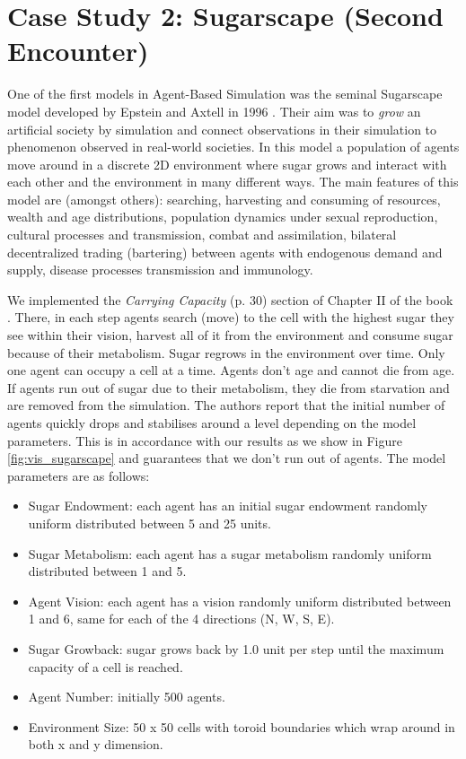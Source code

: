 \section{Case Study 2: Sugarscape (Second Encounter)}
\label{sec:cs_sugarscape}

One of the first models in Agent-Based Simulation was the seminal Sugarscape model developed by Epstein and Axtell in 1996 \cite{epstein_growing_1996}. Their aim was to \textit{grow} an artificial society by simulation and connect observations in their simulation to phenomenon observed in real-world societies. In this model a population of agents move around in a discrete 2D environment where sugar grows and interact with each other and the environment in many different ways. The main features of this model are (amongst others): searching, harvesting and consuming of resources, wealth and age distributions, population dynamics under sexual reproduction, cultural processes and transmission, combat and assimilation, bilateral decentralized trading (bartering) between agents with endogenous demand and supply, disease processes transmission and immunology.

We implemented the \textit{Carrying Capacity} (p. 30) section of Chapter II of the book \cite{epstein_growing_1996}. There, in each step agents search (move) to the cell with the highest sugar they see within their vision, harvest all of it from the environment and consume sugar because of their metabolism. Sugar regrows in the environment over time. Only one agent can occupy a cell at a time. Agents don't age and cannot die from age. If agents run out of sugar due to their metabolism, they die from starvation and are removed from the simulation. The authors report that the initial number of agents quickly drops and stabilises around a level depending on the model parameters. This is in accordance with our results as we show in Figure \ref{fig:vis_sugarscape} and guarantees that we don't run out of agents. The model parameters are as follows:

\begin{itemize}
	\item Sugar Endowment: each agent has an initial sugar endowment randomly uniform distributed between 5 and 25 units.
	\item Sugar Metabolism: each agent has a sugar metabolism randomly uniform distributed between 1 and 5.
	\item Agent Vision: each agent has a vision randomly uniform distributed between 1 and 6, same for each of the 4 directions (N, W, S, E). 
	\item Sugar Growback: sugar grows back by 1.0 unit per step until the maximum capacity of a cell is reached.
	\item Agent Number: initially 500 agents.
	\item Environment Size: 50 x 50 cells with toroid boundaries which wrap around in both x and y dimension.
\end{itemize}


